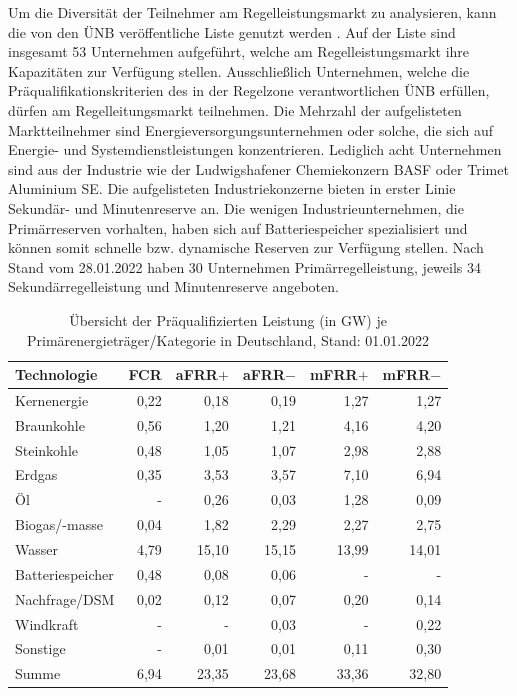 			Um die Diversität der Teilnehmer am Regelleistungsmarkt zu analysieren, kann die von den ÜNB veröffentliche Liste genutzt werden \cite{regelleistungnet_PRL_Ausschreibung}.
			Auf der Liste sind insgesamt \num{53} Unternehmen aufgeführt, welche am Regelleistungsmarkt ihre Kapazitäten zur Verfügung stellen.
			Ausschließlich Unternehmen, welche die Präqualifikationskriterien des in der Regelzone verantwortlichen ÜNB erfüllen, dürfen am Regelleitungsmarkt teilnehmen.
			Die Mehrzahl der aufgelisteten Marktteilnehmer sind Energieversorgungsunternehmen oder solche, die sich auf Energie- und Systemdienstleistungen konzentrieren.
			Lediglich acht Unternehmen sind aus der Industrie wie der Ludwigshafener Chemiekonzern BASF oder Trimet Aluminium SE.
			Die aufgelisteten Industriekonzerne bieten in erster Linie Sekundär- und Minutenreserve an.
			Die wenigen Industrieunternehmen, die Primärreserven vorhalten, haben sich auf Batteriespeicher spezialisiert und können somit schnelle bzw. dynamische Reserven zur Verfügung stellen.
			Nach Stand vom 28.01.2022 haben 30 Unternehmen Primärregelleistung, jeweils 34 Sekundärregelleistung und Minutenreserve angeboten. 
						
			\begin{table}[H]
				\renewcommand*{\arraystretch}{1.3} %
				\centering
				\caption{Übersicht der Präqualifizierten Leistung (in \si{\giga\watt}) je Primärenergieträger/Kategorie in Deutschland, Stand: 01.01.2022 \cite{regelleistungnet_PRL_Ausschreibung}}
				\label{Tab. Übersicht der Präqualifizierten Leistung je PrimärenergieträgerKategorie in Deutschland}
				\begin{tabular}{lrrrrr}
					\hline
					Technologie & FCR  & aFRR$+$ & aFRR$-$& mFRR$+$ & mFRR$-$ \\ \hline
					Kernenergie & 0,22 & 0,18 & 0,19 & 1,27 & 1,27 \\
					Braunkohle & 0,56 & 1,20 & 1,21 & 4,16 & 4,20 \\
					Steinkohle & 0,48 & 1,05 & 1,07 & 2,98 & 2,88 \\
					Erdgas & 0,35 & 3,53 & 3,57 & 7,10 & 6,94 \\
					Öl & - & 0,26 & 0,03 & 1,28 & 0,09 \\
					Biogas/-masse & 0,04 & 1,82 & 2,29 & 2,27 & 2,75 \\
					Wasser & 4,79 & 15,10 & 15,15 & 13,99 & 14,01 \\
					Batteriespeicher & 0,48 & 0,08 & 0,06 & - & - \\
					Nachfrage/DSM & 0,02 & 0,12 & 0,07 & 0,20 & 0,14 \\
					Windkraft & - & - & 0,03 & - & 0,22 \\
					Sonstige & - & 0,01 & 0,01 & 0,11 & 0,30 \\ \hline
					Summe & 6,94 & 23,35 & 23,68 & 33,36 & 32,80
				\end{tabular}
				\renewcommand*{\arraystretch}{1.5} %
			\end{table}
			
